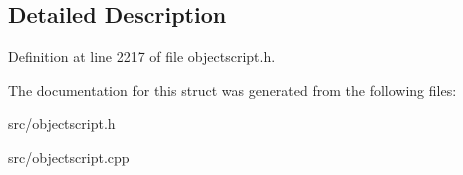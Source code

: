 \subsection{Detailed Description}


Definition at line 2217 of file objectscript.\+h.



The documentation for this struct was generated from the following files\+:\begin{DoxyCompactItemize}
\item 
src/objectscript.\+h\item 
src/objectscript.\+cpp\end{DoxyCompactItemize}
